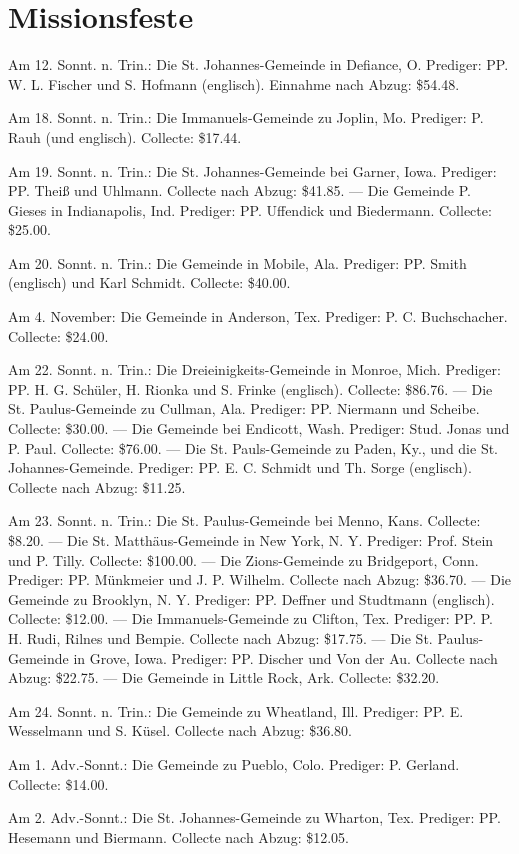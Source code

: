 \chapter[Missionsfeste]{Missionsfeste}
Am 12. Sonnt. n. Trin.: Die St. Johannes-Gemeinde in Defiance, O. Prediger: PP. W. L. Fischer und S. Hofmann (englisch). Einnahme nach Abzug: \$54.48.

Am 18. Sonnt. n. Trin.: Die Immanuels-Gemeinde zu Joplin, Mo. Prediger: P. Rauh (und englisch). Collecte: \$17.44.

Am 19. Sonnt. n. Trin.: Die St. Johannes-Gemeinde bei Garner, Iowa. Prediger: PP. Theiß und Uhlmann. Collecte nach Abzug: \$41.85. — Die Gemeinde P. Gieses in Indianapolis, Ind. Prediger: PP. Uffendick und Biedermann. Collecte: \$25.00.

Am 20. Sonnt. n. Trin.: Die Gemeinde in Mobile, Ala. Prediger: PP. Smith (englisch) und Karl Schmidt. Collecte: \$40.00.

Am 4. November: Die Gemeinde in Anderson, Tex. Prediger: P. C. Buchschacher. Collecte: \$24.00.

Am 22. Sonnt. n. Trin.: Die Dreieinigkeits-Gemeinde in Monroe, Mich. Prediger: PP. H. G. Schüler, H. Rionka und S. Frinke (englisch). Collecte: \$86.76. — Die St. Paulus-Gemeinde zu Cullman, Ala. Prediger: PP. Niermann und Scheibe. Collecte: \$30.00. — Die Gemeinde bei Endicott, Wash. Prediger: Stud. Jonas und P. Paul. Collecte: \$76.00. — Die St. Pauls-Gemeinde zu Paden, Ky., und die St. Johannes-Gemeinde. Prediger: PP. E. C. Schmidt und Th. Sorge (englisch). Collecte nach Abzug: \$11.25.

Am 23. Sonnt. n. Trin.: Die St. Paulus-Gemeinde bei Menno, Kans. Collecte: \$8.20. — Die St. Matthäus-Gemeinde in New York, N. Y. Prediger: Prof. Stein und P. Tilly. Collecte: \$100.00. — Die Zions-Gemeinde zu Bridgeport, Conn. Prediger: PP. Münkmeier und J. P. Wilhelm. Collecte nach Abzug: \$36.70. — Die Gemeinde zu Brooklyn, N. Y. Prediger: PP. Deffner und Studtmann (englisch). Collecte: \$12.00. — Die Immanuels-Gemeinde zu Clifton, Tex. Prediger: PP. P. H. Rudi, Rilnes und Bempie. Collecte nach Abzug: \$17.75. — Die St. Paulus-Gemeinde in Grove, Iowa. Prediger: PP. Discher und Von der Au. Collecte nach Abzug: \$22.75. — Die Gemeinde in Little Rock, Ark. Collecte: \$32.20.

Am 24. Sonnt. n. Trin.: Die Gemeinde zu Wheatland, Ill. Prediger: PP. E. Wesselmann und S. Küsel. Collecte nach Abzug: \$36.80.

Am 1. Adv.-Sonnt.: Die Gemeinde zu Pueblo, Colo. Prediger: P. Gerland. Collecte: \$14.00.

Am 2. Adv.-Sonnt.: Die St. Johannes-Gemeinde zu Wharton, Tex. Prediger: PP. Hesemann und Biermann. Collecte nach Abzug: \$12.05.
